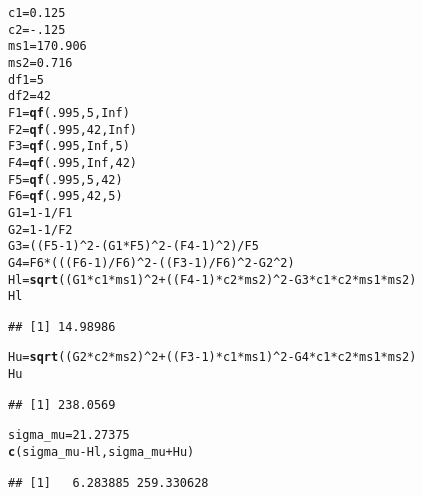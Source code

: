 \documentclass{article}\usepackage[]{graphicx}\usepackage[]{color}
\makeatletter
\newcommand{\hlnum}[1]{\textcolor[rgb]{0.686,0.059,0.569}{#1}}%
\newcommand{\hlopt}[1]{\textcolor[rgb]{0,0,0}{#1}}%
\newcommand{\hlstd}[1]{\textcolor[rgb]{0.345,0.345,0.345}{#1}}%
\newcommand{\hlkwb}[1]{\textcolor[rgb]{0.69,0.353,0.396}{#1}}%
\newcommand{\hlkwd}[1]{\textcolor[rgb]{0.737,0.353,0.396}{\textbf{#1}}}%
\newenvironment{kframe}{%
 \def\at@end@of@kframe{}%
 \ifinner\ifhmode%
  \def\at@end@of@kframe{\end{minipage}}%
  \begin{minipage}{\columnwidth}%
 \fi\fi%
 \def\FrameCommand##1{\hskip\@totalleftmargin \hskip-\fboxsep
 \colorbox{shadecolor}{##1}\hskip-\fboxsep
     \hskip-\linewidth \hskip-\@totalleftmargin \hskip\columnwidth}%
 \MakeFramed {\advance\hsize-\width
   \@totalleftmargin\z@ \linewidth\hsize
   \@setminipage}}%
 {\par\unskip\endMakeFramed%
 \at@end@of@kframe}
\newenvironment{knitrout}{}{} %
\makeatother
\begin{document}
\begin{enumerate}[(a)]
\begin{knitrout}
\color{fgcolor}\begin{kframe}
\begin{alltt}
  \hlstd{c1}\hlkwb{=}\hlnum{0.125}
  \hlstd{c2}\hlkwb{=}\hlopt{-}\hlnum{.125}
  \hlstd{ms1}\hlkwb{=}\hlnum{170.906}
  \hlstd{ms2}\hlkwb{=}\hlnum{0.716}
  \hlstd{df1}\hlkwb{=}\hlnum{5}
  \hlstd{df2}\hlkwb{=}\hlnum{42}
  \hlstd{F1}\hlkwb{=}\hlkwd{qf}\hlstd{(}\hlnum{.995}\hlstd{,}\hlnum{5}\hlstd{,}\hlnum{Inf}\hlstd{)}
  \hlstd{F2}\hlkwb{=}\hlkwd{qf}\hlstd{(}\hlnum{.995}\hlstd{,}\hlnum{42}\hlstd{,}\hlnum{Inf}\hlstd{)}
  \hlstd{F3}\hlkwb{=}\hlkwd{qf}\hlstd{(}\hlnum{.995}\hlstd{,}\hlnum{Inf}\hlstd{,}\hlnum{5}\hlstd{)}
  \hlstd{F4}\hlkwb{=}\hlkwd{qf}\hlstd{(}\hlnum{.995}\hlstd{,}\hlnum{Inf}\hlstd{,}\hlnum{42}\hlstd{)}
  \hlstd{F5}\hlkwb{=}\hlkwd{qf}\hlstd{(}\hlnum{.995}\hlstd{,}\hlnum{5}\hlstd{,}\hlnum{42}\hlstd{)}
  \hlstd{F6}\hlkwb{=}\hlkwd{qf}\hlstd{(}\hlnum{.995}\hlstd{,}\hlnum{42}\hlstd{,}\hlnum{5}\hlstd{)}
  \hlstd{G1}\hlkwb{=}\hlnum{1}\hlopt{-}\hlnum{1}\hlopt{/}\hlstd{F1}
  \hlstd{G2}\hlkwb{=}\hlnum{1}\hlopt{-}\hlnum{1}\hlopt{/}\hlstd{F2}
  \hlstd{G3}\hlkwb{=}\hlstd{((F5}\hlopt{-}\hlnum{1}\hlstd{)}\hlopt{^}\hlnum{2}\hlopt{-}\hlstd{(G1}\hlopt{*}\hlstd{F5)}\hlopt{^}\hlnum{2}\hlopt{-}\hlstd{(F4}\hlopt{-}\hlnum{1}\hlstd{)}\hlopt{^}\hlnum{2}\hlstd{)}\hlopt{/}\hlstd{F5}
  \hlstd{G4}\hlkwb{=}\hlstd{F6}\hlopt{*}\hlstd{( ((F6}\hlopt{-}\hlnum{1}\hlstd{)}\hlopt{/}\hlstd{F6)}\hlopt{^}\hlnum{2} \hlopt{-} \hlstd{((F3}\hlopt{-}\hlnum{1}\hlstd{)}\hlopt{/}\hlstd{F6)}\hlopt{^}\hlnum{2} \hlopt{-} \hlstd{G2}\hlopt{^}\hlnum{2} \hlstd{)}
  \hlstd{Hl} \hlkwb{=} \hlkwd{sqrt}\hlstd{( (G1}\hlopt{*}\hlstd{c1}\hlopt{*}\hlstd{ms1)}\hlopt{^}\hlnum{2} \hlopt{+} \hlstd{((F4}\hlopt{-}\hlnum{1}\hlstd{)}\hlopt{*}\hlstd{c2}\hlopt{*}\hlstd{ms2)}\hlopt{^}\hlnum{2} \hlopt{-} \hlstd{G3}\hlopt{*}\hlstd{c1}\hlopt{*}\hlstd{c2}\hlopt{*}\hlstd{ms1}\hlopt{*}\hlstd{ms2)}
  \hlstd{Hl}
\end{alltt}
\begin{verbatim}
## [1] 14.98986
\end{verbatim}
\begin{alltt}
  \hlstd{Hu} \hlkwb{=} \hlkwd{sqrt}\hlstd{( (G2}\hlopt{*}\hlstd{c2}\hlopt{*}\hlstd{ms2)}\hlopt{^}\hlnum{2} \hlopt{+} \hlstd{((F3}\hlopt{-}\hlnum{1}\hlstd{)}\hlopt{*}\hlstd{c1}\hlopt{*}\hlstd{ms1)}\hlopt{^}\hlnum{2} \hlopt{-} \hlstd{G4}\hlopt{*}\hlstd{c1}\hlopt{*}\hlstd{c2}\hlopt{*}\hlstd{ms1}\hlopt{*}\hlstd{ms2)}
  \hlstd{Hu}
\end{alltt}
\begin{verbatim}
## [1] 238.0569
\end{verbatim}
\begin{alltt}
  \hlstd{sigma_mu} \hlkwb{=} \hlnum{21.27375}
  \hlkwd{c}\hlstd{(sigma_mu}\hlopt{-}\hlstd{Hl, sigma_mu}\hlopt{+}\hlstd{Hu)}
\end{alltt}
\begin{verbatim}
## [1]   6.283885 259.330628
\end{verbatim}
\end{kframe}
\end{knitrout}


\end{enumerate}
\end{document}
